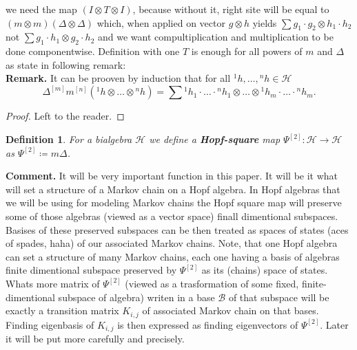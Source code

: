 \documentclass[a4paper]{article}
\newtheorem{definition}{Definition}
\begin{document}
we need the map $(I \otimes T \otimes I)$, because without it, right site will be equal to
$(m \otimes m)(\Delta \otimes \Delta)$ which, when applied on vector $g \otimes h$ yields
$\displaystyle\sum g_1 \cdot g_2 \otimes h_1 \cdot h_2$ not $\sum g_1 \cdot h_1 \otimes g_2 \cdot h_2$
and we want compultiplication and multiplication to be done componentwise. Definition with
one $T$ is enough for all powers of $m$ and $\Delta$ as state in following remark:\\
\textbf{Remark. } It can be prooven by induction that for all ${^1h}, \dots, {^nh} \in \mathcal{H}$
\begin{equation}
\Delta^{[m]}m^{[n]}({^1h} \otimes \dots \otimes {^nh}) = \sum {^1h}_1 \cdot \ldots \cdot {^nh}_1
\otimes \dots \otimes {^1h}_m\cdot  \ldots \cdot {^nh}_m.
\end{equation}
\begin{proof}
Left to the reader.
\end{proof}
\begin{definition}
For a bialgebra $\mathcal{H}$ we define a \textbf{Hopf-square} map
$\Psi^{[2]} : \mathcal{H} \to \mathcal{H}$ as $\Psi^{[2]} \coloneqq m\Delta$.
\end{definition}
\textbf{Comment. } It will be very important function in this paper. It will be it what will set a structure
of a Markov chain on a Hopf algebra. In Hopf algebras that we will
be using for modeling Markov chains the Hopf square map will preserve some of those algebras
(viewed as a vector space) finall dimentional subspaces. Basises of these preserved
subspaces can be then treated as spaces of states (aces of spades, haha)
of our associated Markov chains. Note, that one Hopf algebra can set a structure of many Markov chains,
each one having a basis of algebras finite dimentional subspace preserved by $\Psi^{[2]}$ as its (chains)
space of states.
Whats more matrix of $\Psi^{[2]}$ (viewed as a trasformation of some fixed, finite-dimentional
subspace of algebra)
writen in a base $\mathcal{B}$ of that subspace will be exactly a transition matrix
$K_{i,j}$ of associated Markov chain on that bases. Finding eigenbasis of $K_{i,j}$ is then expressed as
finding eigenvectors of $\Psi^{[2]}$. Later it will be put more carefully and precisely. \\
\end{document}
